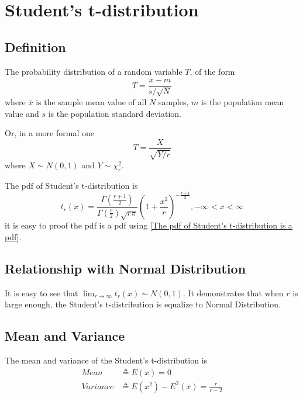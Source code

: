 \documentclass[a4paper]{article}
\begin{document}
\section{Student's t-distribution}

\subsection{Definition}
The probability distribution of a random variable $T$, of the form
\begin{equation*}
    T = \frac{\bar{x} - m}{s / \sqrt{N}}
\end{equation*}
where $\bar{x}$ is the sample mean value of all $N$ samples, $m$ is the population mean value and $s$ is the population standard deviation.

Or, in a more formal one
\begin{equation}
    T = \frac{X}{\sqrt{Y/r}}
\end{equation}
where $X \sim N(0, 1)$ and $Y \sim \chi_r^2$.

The pdf of Student's t-distribution is
\begin{equation}
    t_r(x) = \frac{\Gamma(\frac{r+1}{2})}{\Gamma(\frac{r}{2}) \sqrt{r\pi}} (1+\frac{x^2}{r})^{-\frac{r+1}{2}}, -\infty < x < \infty
\end{equation}
it is easy to proof the pdf is a pdf using \ref{The pdf of Student's t-distribution is a pdf}.

\subsection{Relationship with Normal Distribution}
It is easy to see that $\lim_{r \to \infty} t_r(x) \sim N(0, 1)$.
It demonstrates that when $r$ is large enough, the Student's t-distribution is equalize to Normal Distribution.

\subsection{Mean and Variance}
The mean and variance of the Student's t-distribution is
\begin{equation*}
    \begin{aligned}
        Mean     & \triangleq E(x) = 0                        \\
        Variance & \triangleq E(x^2) - E^2(x) = \frac{r}{r-2}
    \end{aligned}
\end{equation*}
\end{document}
